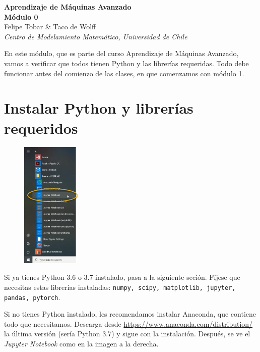 \documentclass[a4paper,11pt]{article}
\begin{document}
\begin{center}
    {\huge\bfseries Aprendizaje de Máquinas Avanzado}\\[3mm]
    {\Large\bfseries Módulo 0}\\[3mm]
    {\Large Felipe Tobar \& Taco de Wolff}\\
    {\normalsize\textit{Centro de Modelamiento Matemático, Universidad de Chile}}\\
\end{center}

En este módulo, que es parte del curso Aprendizaje de Máquinas Avanzado, vamos a verificar que todos tienen Python y las librerías requeridas. Todo debe funcionar antes del comienzo de las clases, en que comenzamos con módulo 1.

\section{Instalar Python y librerías requeridos}

\begin{figure}
    \vspace{-10pt}
    \includegraphics[width=0.25\textwidth]{windows_start_jupyter_notebook.png}
    \vspace{-50pt}
\end{figure}

Si ya tienes Python 3.6 o 3.7 instalado, pasa a la siguiente seción. Fíjese que necesitas estas librerías instaladas: \texttt{numpy, scipy, matplotlib, jupyter, pandas, pytorch}.

Si no tienes Python instalado, les recomendamos instalar Anaconda, que contiene todo que necesitamos. Descarga desde \url{https://www.anaconda.com/distribution/} la última versión (sería Python 3.7) y sigue con la instalación. Después, se ve el \emph{Jupyter Notebook} como en la imagen a la derecha.
\end{document}
